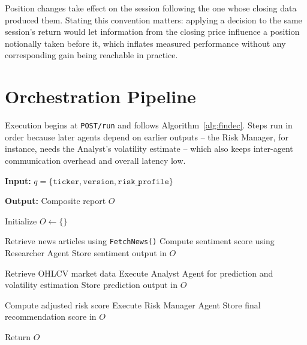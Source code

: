\documentclass[conference]{IEEEtran}
\begin{document}
Position changes take effect on the session following the one whose closing data produced them. Stating this convention matters: applying a decision to the same session's return would let information from the closing price influence a position notionally taken before it, which inflates measured performance without any corresponding gain being reachable in practice.

\section{Orchestration Pipeline}
\label{sec:pipeline}

Execution begins at \texttt{POST/run} and follows Algorithm~\ref{alg:findec}. Steps run in order because later agents depend on earlier outputs -- the Risk Manager, for instance, needs the Analyst's volatility estimate -- which also keeps inter-agent communication overhead and overall latency low.

\begin{algorithm}[htbp]
\caption{FINDEC Orchestration Workflow}
\label{alg:findec}

\textbf{Input:}
$q = \{\texttt{ticker}, \texttt{version}, \texttt{risk\_profile}\}$

\textbf{Output:}
Composite report $O$

\begin{algorithmic}[1]

\STATE Initialize $O \leftarrow \{\}$

    \STATE Retrieve news articles using \texttt{FetchNews()}
    \STATE Compute sentiment score using Researcher Agent
    \STATE Store sentiment output in $O$
\ENDIF

    \STATE Retrieve OHLCV market data
    \STATE Execute Analyst Agent for prediction and volatility estimation
    \STATE Store prediction output in $O$
\ENDIF

    \STATE Compute adjusted risk score
    \STATE Execute Risk Manager Agent
    \STATE Store final recommendation score in $O$
\ENDIF

\STATE Return $O$

\end{algorithmic}
\end{algorithm}
\end{document}
